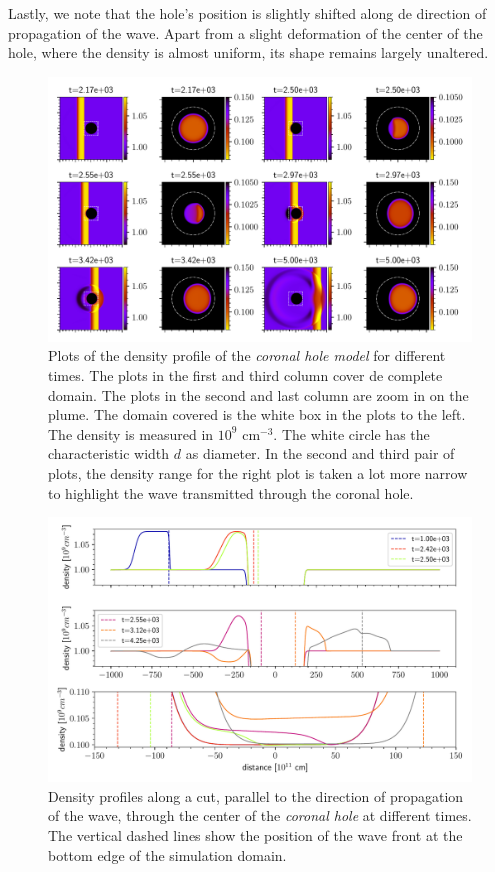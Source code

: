 Lastly, we note that the hole's position is slightly shifted along de direction of propagation of the wave.
Apart from a slight deformation of the center of the hole, where the density is almost uniform, its shape remains largely unaltered.

\begin{figure}[H]
	\centering
	\includegraphics[width=\linewidth]{images/hole-frames.pdf}
	\caption{Plots of the density profile of the \emph{coronal hole model} for different times. 
	The plots in the first and third column cover de complete domain.
	The plots in the second and last column are zoom in on the plume. 
	The domain covered is the white box in the plots to the left.
 The density is measured in $10^{9}$ cm$^{-3}$.
The white circle has the characteristic width $d$ as diameter. 
In the second and third pair of plots, the density range for the right plot is taken a lot more narrow to highlight the wave transmitted through the coronal hole.}
	\label{fig:hole-frames}
\end{figure}

\begin{figure}[H]
	\centering
	\includegraphics[width=\linewidth]{images/hole-sections.pdf}
	\caption{Density profiles along a cut, parallel to the direction of propagation of the wave, through the center of the \emph{coronal hole} at different times. The vertical dashed lines show the position of the wave front at the bottom edge of the simulation domain.}
	\label{fig:hole-sections}
\end{figure}


